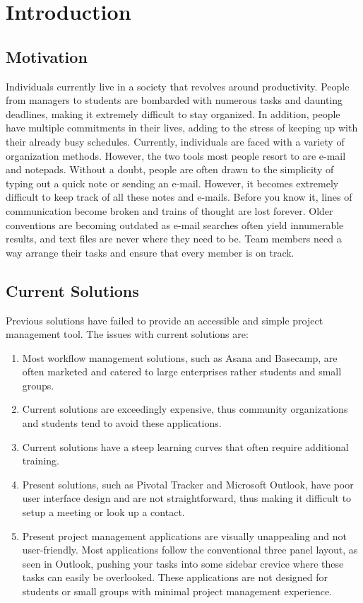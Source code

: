\chapter{Introduction}

\section{Motivation}

Individuals currently live in a society that revolves around productivity. People from managers to students are bombarded with numerous tasks and daunting deadlines, making it extremely difficult to stay organized. In addition, people have multiple commitments in their lives, adding to the stress of keeping up with their already busy schedules. Currently, individuals are faced with a variety of organization methods. However, the two tools most people resort to are e-mail and notepads. Without a doubt, people are often drawn to the simplicity of typing out a quick note or sending an e-mail. However, it becomes extremely difficult to keep track of all these notes and e-mails. Before you know it, lines of communication become broken and trains of thought are lost forever. Older conventions are becoming outdated as e-mail searches often yield innumerable results, and text files are never where they need to be. Team members need a way arrange their tasks and ensure that every member is on track.

\section{Current Solutions} 

Previous solutions have failed to provide an accessible and simple project management tool. The issues with current solutions are:
\begin{enumerate} 
	\item Most workflow management solutions, such as Asana and Basecamp, are often marketed and catered to large enterprises rather students and small groups. 
	\item Current solutions are exceedingly expensive, thus community organizations and students tend to avoid these applications. 
	\item Current solutions have a steep learning curves that often require additional training. 
	\item Present solutions, such as Pivotal Tracker and Microsoft Outlook, have poor user interface design and are not straightforward, thus making it difficult to setup a meeting or look up a contact. 
	\item Present project management applications are visually unappealing and not user-friendly. Most applications follow the conventional three panel layout, as seen in Outlook, pushing your tasks into some sidebar crevice where these tasks can easily be overlooked. These applications are not designed for students or small groups with minimal project management experience.
\end{enumerate}

